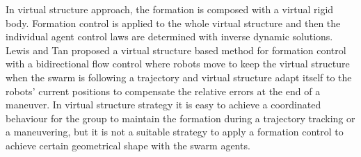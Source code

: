 \documentclass[letterpaper, 10 pt, conference]{ieeeconf}  %
\begin{document}
In virtual structure approach, the formation is composed with a virtual rigid body. Formation control is applied to the whole virtual structure and then the individual agent control laws are determined with inverse dynamic solutions.  Lewis and Tan \cite{23} proposed a virtual structure based method for formation control  with a bidirectional flow control where robots move to keep the virtual structure when the swarm is following a trajectory and virtual structure adapt itself to the robots' current positions to compensate the relative errors at the end of a maneuver. In virtual structure strategy it is easy to achieve a coordinated behaviour for the group to maintain the formation during a trajectory tracking or a maneuvering, but it is not a suitable strategy to apply a formation control to achieve certain geometrical shape with the swarm agents. 
\end{document}
